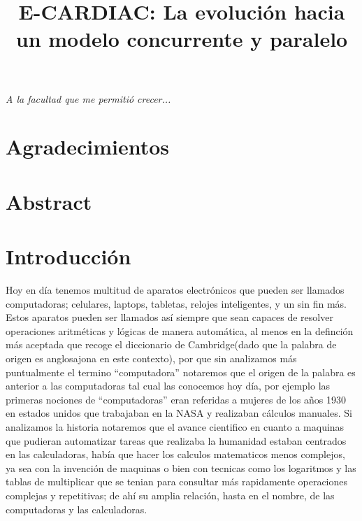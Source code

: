 \documentclass[letterpaper,12pt,oneside]{book}
\title{E-CARDIAC: La evolución hacia un modelo concurrente y paralelo}
\begin{document}
	\frontmatter

    

\chapter*{}
\begin{flushright}%
  \emph{A la facultad que me permitió crecer...}
  \thispagestyle{empty}
\end{flushright}

\chapter{Agradecimientos}

\chapter{Abstract}

\chapter{Introducción}

	Hoy en día tenemos multitud de aparatos electrónicos que pueden ser llamados computadoras; celulares, laptops, tabletas, relojes inteligentes, y un sin fin más. 
	Estos aparatos pueden ser llamados así siempre que sean  capaces de resolver operaciones aritméticas y lógicas de manera automática, al menos en la definción
	más aceptada que recoge el diccionario de Cambridge(dado que la palabra de origen es anglosajona en este contexto),
	por que sin analizamos más puntualmente el termino ``computadora''  notaremos que el origen de la palabra es anterior a las computadoras
	tal cual las conocemos hoy día, por ejemplo las primeras nociones de ``computadoras''  eran referidas a mujeres de los años 1930 en estados unidos
	que trabajaban en la NASA y realizaban cálculos manuales. Si analizamos la historia notaremos que el avance cientifico en cuanto a maquinas
	que pudieran automatizar tareas que realizaba la humanidad estaban centrados en las calculadoras, había que hacer los calculos matematicos menos
	complejos, ya sea con la invención de maquinas o bien con tecnicas como los logaritmos y las tablas de multiplicar que se tenian
	para consultar más rapidamente operaciones complejas y repetitivas; de ahí su amplia relación, hasta en el nombre, de las computadoras y las calculadoras.
	
\end{document}
